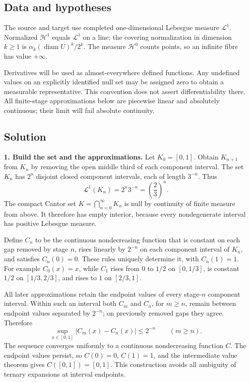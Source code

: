 \documentclass[
  11pt,
]{article}
\begin{document}
\subsection{Data and hypotheses}\label{data-and-hypotheses-12}

The source and target use completed one-dimensional Lebesgue measure
\(\mathcal L^1\). Normalized \(\mathcal H^1\) equals \(\mathcal L^1\) on
a line; the covering normalization in dimension \(k\geq1\) is
\(\alpha_k(\operatorname{diam}U)^k/2^k\). The measure \(\mathcal H^0\)
counts points, so an infinite fibre has value \(+\infty\).

Derivatives will be used as almost-everywhere defined functions. Any
undefined values on an explicitly identified null set may be assigned
zero to obtain a measurable representative. This convention does not
assert differentiability there. All finite-stage approximations below
are piecewise linear and absolutely continuous; their limit will fail
absolute continuity.

\subsection{Solution}\label{solution-12}

\textbf{1. Build the set and the approximations.} Let \(K_0=[0,1]\).
Obtain \(K_{n+1}\) from \(K_n\) by removing the open middle third of
each component interval. The set \(K_n\) has \(2^n\) disjoint closed
component intervals, each of length \(3^{-n}\). Thus \[
\mathcal L^1(K_n)=2^n3^{-n}=\left(\frac23\right)^n.
\] The compact Cantor set \(K=\bigcap_{n=0}^{\infty}K_n\) is null by
continuity of finite measure from above. It therefore has empty
interior, because every nondegenerate interval has positive Lebesgue
measure.

Define \(C_n\) to be the continuous nondecreasing function that is
constant on each gap removed by stage \(n\), rises linearly by
\(2^{-n}\) on each component interval of \(K_n\), and satisfies
\(C_n(0)=0\). These rules uniquely determine it, with \(C_n(1)=1\). For
example \(C_0(x)=x\), while \(C_1\) rises from \(0\) to \(1/2\) on
\([0,1/3]\), is constant \(1/2\) on \([1/3,2/3]\), and rises to \(1\) on
\([2/3,1]\).

All later approximations retain the endpoint values of every stage-\(n\)
component interval. Within such an interval both \(C_m\) and \(C_n\),
for \(m\geq n\), remain between endpoint values separated by \(2^{-n}\);
on previously removed gaps they agree. Therefore \[
\sup_{x\in[0,1]}|C_m(x)-C_n(x)|\leq2^{-n}\qquad(m\geq n).
\] The sequence converges uniformly to a continuous nondecreasing
function \(C\). The endpoint values persist, so \(C(0)=0\), \(C(1)=1\),
and the intermediate value theorem gives \(C([0,1])=[0,1]\). This
construction avoids all ambiguity of ternary expansions at interval
endpoints.
\end{document}
